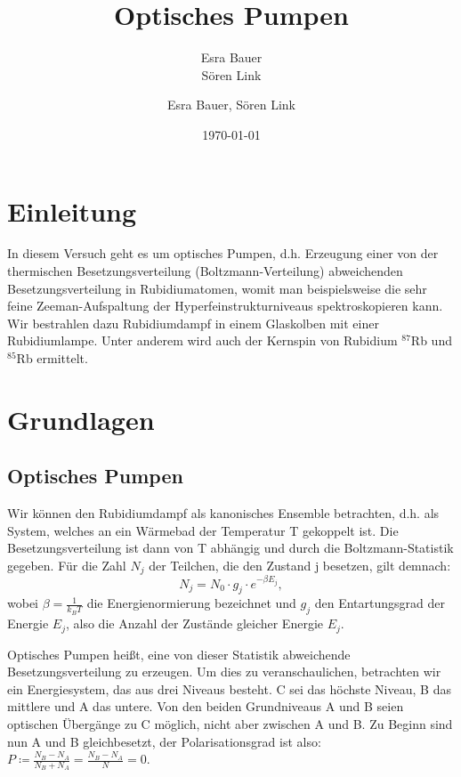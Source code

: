\documentclass[bigchapter,colorback,accentcolor=tud4b,linedtoc,11pt]{tudreport}
\title{Optisches Pumpen}
\subtitle{Esra Bauer  \\Sören Link}
\author{Esra Bauer, Sören Link}
\date{\today}
\begin{document}

\maketitle

\tableofcontents

\chapter{Einleitung}

In diesem Versuch geht es um optisches Pumpen, d.h. Erzeugung einer von der thermischen Besetzungsverteilung (Boltzmann-Verteilung) abweichenden Besetzungsverteilung in Rubidiumatomen, womit man beispielsweise die sehr feine Zeeman-Aufspaltung der Hyperfeinstrukturniveaus spektroskopieren kann. Wir bestrahlen dazu Rubidiumdampf in einem Glaskolben mit einer Rubidiumlampe. Unter anderem wird auch der Kernspin von Rubidium $^{87}$Rb und $^{85}$Rb ermittelt.

\chapter{Grundlagen}

\section{Optisches Pumpen}

Wir können den Rubidiumdampf als kanonisches Ensemble betrachten, d.h. als System, welches an ein Wärmebad der Temperatur T gekoppelt ist. Die Besetzungsverteilung ist dann von T abhängig und durch die Boltzmann-Statistik gegeben. Für die Zahl $N_j$ der Teilchen, die den Zustand j besetzen, gilt demnach:
$$N_j = N_0 \cdot g_j \cdot e^{- \beta E_j},$$
wobei $\beta = \frac{1}{k_B T}$ die Energienormierung bezeichnet und $g_j$ den Entartungsgrad der Energie $E_j$, also die Anzahl der Zustände gleicher Energie $E_j$.

Optisches Pumpen heißt, eine von dieser Statistik abweichende Besetzungsverteilung zu erzeugen. Um dies zu veranschaulichen, betrachten wir ein Energiesystem, das aus drei Niveaus besteht. C sei das höchste Niveau, B das mittlere und A das untere. Von den beiden Grundniveaus A und B seien optischen Übergänge zu C möglich, nicht aber zwischen A und B. Zu Beginn sind nun A und B gleichbesetzt, der Polarisationsgrad ist also: $P \coloneqq \frac{N_B-N_A}{N_B+N_A} = \frac{N_B-N_A}{N} = 0$.
\end{document}
